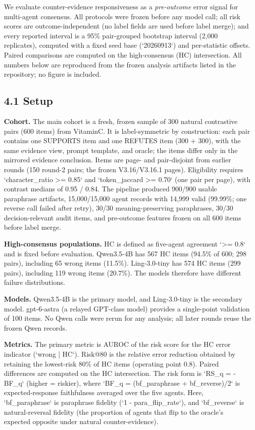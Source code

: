 \documentclass[11pt]{article}
\begin{document}
We evaluate counter-evidence responsiveness as a \emph{pre-outcome} error signal for multi-agent consensus. All protocols were frozen before any model call; all risk scores are outcome-independent (no label fields are used before label merge); and every reported interval is a 95\% pair-grouped bootstrap interval (2,000 replicates), computed with a fixed seed base (`20260913`) and per-statistic offsets. Paired comparisons are computed on the high-consensus (HC) intersection. All numbers below are reproduced from the frozen analysis artifacts listed in the repository; no figure is included.

\subsection{4.1 Setup}

\textbf{Cohort.} The main cohort is a fresh, frozen sample of 300 natural contrastive pairs (600 items) from VitaminC. It is label-symmetric by construction: each pair contains one SUPPORTS item and one REFUTES item (300 + 300), with the same evidence view, prompt template, and oracle; the items differ only in the mirrored evidence conclusion. Items are page- and pair-disjoint from earlier rounds (150 round-2 pairs; the frozen V3.16/V3.16.1 pages). Eligibility requires `character\_ratio >= 0.85` and `token\_jaccard >= 0.70` (one pair per page), with contrast medians of 0.95 / 0.84. The pipeline produced 900/900 usable paraphrase artifacts, 15,000/15,000 agent records with 14,999 valid (99.99\%; one reverse call failed after retry), 30/30 meaning-preserving paraphrases, 30/30 decision-relevant audit items, and pre-outcome features frozen on all 600 items before label merge.

\textbf{High-consensus populations.} HC is defined as five-agent agreement `>= 0.8` and is fixed before evaluation. Qwen3.5-4B has 567 HC items (94.5\% of 600; 298 pairs), including 65 wrong items (11.5\%). Ling-3.0-tiny has 574 HC items (299 pairs), including 119 wrong items (20.7\%). The models therefore have different failure distributions.

\textbf{Models.} Qwen3.5-4B is the primary model, and Ling-3.0-tiny is the secondary model. gpt-6-astra (a relayed GPT-class model) provides a single-point validation of 100 items. No Qwen calls were rerun for any analysis; all later rounds reuse the frozen Qwen records.

\textbf{Metrics.} The primary metric is AUROC of the risk score for the HC error indicator (`wrong | HC`). Risk@80 is the relative error reduction obtained by retaining the lowest-risk 80\% of HC items (operating point 0.8). Paired differences are computed on the HC intersection. The risk form is `RS\_q = -BF\_q` (higher = riskier), where `BF\_q = (bf\_paraphrase + bf\_reverse)/2` is expected-response faithfulness averaged over the five agents. Here, `bf\_paraphrase` is paraphrase fidelity (`1 - para\_flip\_rate`), and `bf\_reverse` is natural-reversal fidelity (the proportion of agents that flip to the oracle's expected opposite under natural counter-evidence).
\end{document}

